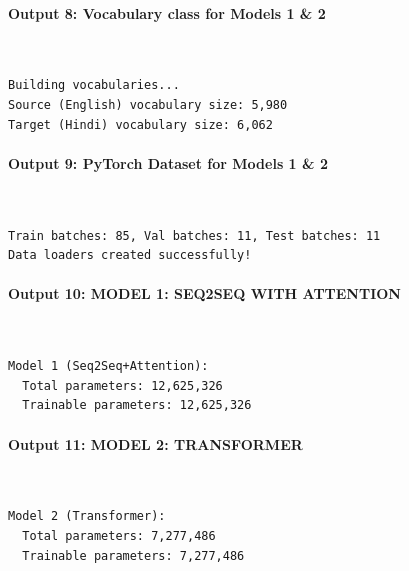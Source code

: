 \documentclass[12pt,a4paper,oneside]{report}
\begin{document}
\paragraph{Output 8: Vocabulary class for Models 1 \& 2}\mbox{}\\[-1ex]
\begin{Verbatim}[commandchars=\\\{\},breaklines=true,breakanywhere=true,fontsize=\scriptsize,frame=leftline,framesep=2mm,rulecolor=\color{gray}]
Building vocabularies...
Source (English) vocabulary size: 5,980
Target (Hindi) vocabulary size: 6,062
\end{Verbatim}
\paragraph{Output 9: PyTorch Dataset for Models 1 \& 2}\mbox{}\\[-1ex]
\begin{Verbatim}[commandchars=\\\{\},breaklines=true,breakanywhere=true,fontsize=\scriptsize,frame=leftline,framesep=2mm,rulecolor=\color{gray}]
Train batches: 85, Val batches: 11, Test batches: 11
Data loaders created successfully!
\end{Verbatim}
\paragraph{Output 10: MODEL 1: SEQ2SEQ WITH ATTENTION}\mbox{}\\[-1ex]
\begin{Verbatim}[commandchars=\\\{\},breaklines=true,breakanywhere=true,fontsize=\scriptsize,frame=leftline,framesep=2mm,rulecolor=\color{gray}]
Model 1 (Seq2Seq+Attention):
  Total parameters: 12,625,326
  Trainable parameters: 12,625,326
\end{Verbatim}
\paragraph{Output 11: MODEL 2: TRANSFORMER}\mbox{}\\[-1ex]
\begin{Verbatim}[commandchars=\\\{\},breaklines=true,breakanywhere=true,fontsize=\scriptsize,frame=leftline,framesep=2mm,rulecolor=\color{gray}]
Model 2 (Transformer):
  Total parameters: 7,277,486
  Trainable parameters: 7,277,486
\end{Verbatim}
\end{document}
